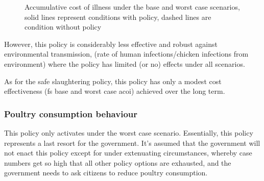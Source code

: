 \begin{figure}[h!]
\begin{minipage}{0.45\textwidth}
        \caption{Accumulative cost of illness under the base and worst case scenarios, solid lines represent conditions with policy, dashed lines are condition without policy}
        \label{fig:fs_bwc_acoi}
    \end{minipage}
\end{figure}

However, this policy is considerably less effective and robust against environmental transmission, (rate of human infections/chicken infections from environment) where the policy has limited  (or no) effects under all scenarios.

As for the safe slaughtering policy, this policy has only a modest cost effectiveness (fs base and worst case acoi) achieved over the long term.


\subsubsection{Poultry consumption behaviour}
\label{sec: consumption behaviour}

This policy only activates under the worst case scenario. Essentially, this policy represents a last resort for the government. It's assumed that the government will not enact this policy except for under extenuating circumstances, whereby case numbers get so high that all other policy options are exhausted, and the government needs to ask citizens to reduce poultry consumption.

